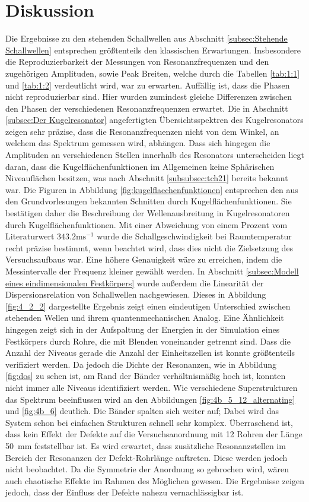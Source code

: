 \section{Diskussion}
\label{sec:Diskussion}
Die Ergebnisse zu den stehenden Schallwellen aus Abschnitt \ref{subsec:Stehende Schallwellen} entsprechen größtenteils den klassischen Erwartungen. 
Insbesondere die Reproduzierbarkeit der Messungen von Resonanzfrequenzen und den zugehörigen Amplituden, sowie Peak Breiten, welche durch die Tabellen \ref{tab:1:1} und \ref{tab:1:2} verdeutlicht wird, war zu erwarten.
Auffällig ist, dass die Phasen nicht reproduzierbar sind. 
Hier wurden zumindest gleiche Differenzen zwischen den Phasen der verschiedenen Resonanzfrequenzen erwartet.
Die in Abschnitt \ref{subsec:Der Kugelresonator} angefertigten Übersichtsspektren des Kugelresonators zeigen sehr präzise, dass die Resonanzfrequenzen nicht von dem Winkel, an welchem das Spektrum gemessen wird, abhängen.
Dass sich hingegen die Amplituden an verschiedenen Stellen innerhalb des Resonators unterscheiden liegt daran, dass die Kugelflächenfunktionen im Allgemeinen keine Sphärischen Niveauflächen besitzen, was nach Abschnitt \ref{subsubsec:tch21} bereits bekannt war.
Die Figuren in Abbildung \ref{fig:kugelflaechenfunktionen} entsprechen den aus den Grundvorlesungen bekannten Schnitten durch Kugelflächenfunktionen.
Sie bestätigen daher die Beschreibung der Wellenausbreitung in Kugelresonatoren durch Kugelflächenfunktionen.
Mit einer Abweichung von einem Prozent vom Literaturwert $343.2\text{ms}^{-1}$ \cite{giancoli} wurde die Schallgeschwindigkeit bei Raumtemperatur recht präzise bestimmt, wenn beachtet wird, dass dies nicht die Zielsetzung des Versuchsaufbaus war. 
Eine höhere Genauigkeit wäre zu erreichen, indem die Messintervalle der Frequenz kleiner gewählt werden. 
In Abschnitt \ref{subsec:Modell eines eindimensionalen Festkörpers} wurde außerdem die Linearität der Dispersionsrelation von Schallwellen nachgewiesen.
Dieses in Abbildung \ref{fig:4_2_2} dargestellte Ergebnis zeigt einen eindeutigen Unterschied zwischen stehenden Wellen und ihrem quantenmechanischen Analog.
Eine Ähnlichkeit hingegen zeigt sich in der Aufspaltung der Energien in der Simulation eines Festkörpers durch Rohre, die mit Blenden voneinander getrennt sind.
Dass die Anzahl der Niveaus gerade die Anzahl der Einheitszellen ist konnte größtenteils verifiziert werden. 
Da jedoch die Dichte der Resonanzen, wie in Abbildung \ref{fig:dos} zu sehen ist, am Rand der Bänder verhältnismäßig hoch ist, konnten nicht immer alle Niveaus identifiziert werden.
Wie verschiedene Superstrukturen das Spektrum beeinflussen wird an den Abbildungen \ref{fig:4b_5_12_alternating} und \ref{fig:4b_6} deutlich. 
Die Bänder spalten sich weiter auf; Dabei wird das System schon bei einfachen Strukturen schnell sehr komplex.
Überraschend ist, dass kein Effekt der Defekte auf die Versuchsanordnung mit 12 Rohren der Länge 50~mm feststellbar ist.
Es wird erwartet, dass zusätzliche Resonanzstellen im Bereich der Resonanzen der Defekt-Rohrlänge auftreten. 
Diese werden jedoch nicht beobachtet.
Da die Symmetrie der Anordnung so gebrochen wird, wären auch chaotische Effekte im Rahmen des Möglichen gewesen.
Die Ergebnisse zeigen jedoch, dass der Einfluss der Defekte nahezu vernachlässigbar ist.